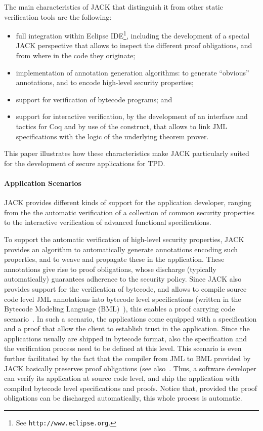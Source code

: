 The main characteristics of JACK that distinguish it from other static
verification tools are the following:
\begin{itemize}
\item full integration within Eclipse IDE\footnote{See
\texttt{http://www.eclipse.org}.}, including the development of a
special JACK perspective that allows to inspect the different proof
obligations, and from where in the code they originate;
\item implementation of annotation generation algorithms: to
generate ``obvious'' annotations, and to encode high-level security
properties;
\item support for verification of bytecode programs; and
\item support for interactive verification, by the development of an interface
and tactics for Coq and by use of the \native construct, that allows to
link JML specifications with the logic of the underlying theorem
prover. 
\end{itemize}
This paper illustrates how these characteristics make JACK
particularly suited for the development of secure applications for
TPD.

\paragraph{Application Scenarios}
JACK provides different kinds of support for the application
developer, ranging from the the automatic verification of a collection
of common security properties to the interactive verification of
advanced functional specifications.

To support the automatic verification of high-level security
properties, JACK provides an algorithm to automatically generate
annotations encoding such properties, and to weave and propagate these
in the application. These annotations give rise to proof obligations,
whose discharge (typically automatically) guarantees adherence to the
security policy. Since JACK also provides support for the verification
of bytecode, and allows to compile source code level JML annotations
into bytecode level specifications (written in the Bytecode Modeling
Language (BML)~\cite{BurdyHP07}), this enables a proof carrying code
scenario~\cite{Necula97}. In such a scenario, the applications come
equipped with a specification and a proof that allow the client to
establish trust in the application. Since the applications usually are
shipped in bytecode format, also the specification and the
verification process need to be defined at this level. This scenario
is even further facilitated by the fact that the compiler from JML to
BML provided by JACK basically preserves proof obligations (see
also~\cite{gta05:fast}. Thus, a software developer can verify its
application at source code level, and ship the application with
compiled bytecode level specifications and proofs. Notice that,
provided the proof obligations can be discharged automatically, this
whole process is automatic.

